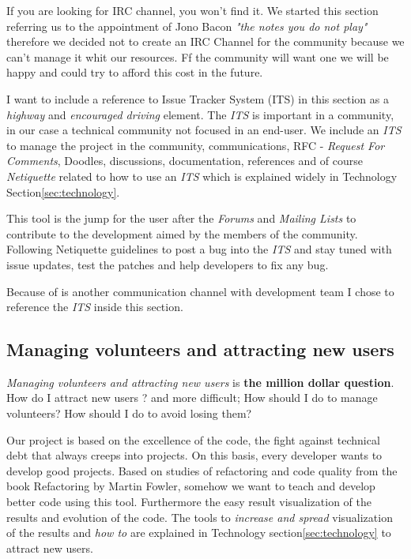 \documentclass[11pt]{scrartcl}
\begin{document}
\par If you are looking for IRC channel, you won't find it. We started this section referring us to the appointment of Jono Bacon \emph{"the notes you do not play"} therefore we decided not to create an IRC Channel for the community because we can't manage it whit our resources. Ff the community will want one we will be happy and could try to afford this cost in the future.

\par I want to include a reference to Issue Tracker System (ITS) in this section as a \emph{highway} and \emph{encouraged driving} element. The \emph{ITS} is important in a community, in our case a technical community not focused in an end-user. We include an \emph{ITS} to manage the project in the community, communications, RFC - \emph{Request For Comments}, Doodles, discussions, documentation, references and of course \emph{Netiquette} related to how to use an \emph{ITS} which is explained widely in Technology Section\ref{sec:technology}.

\par This tool is the jump for the user after the \emph{Forums} and \emph{Mailing Lists} to contribute to the development aimed by the members of the community. Following Netiquette guidelines to post a bug into the \emph{ITS} and stay tuned with issue updates, test the patches and help developers to fix any bug.

\par Because of is another communication channel with development team I chose to reference the \emph{ITS} inside this section.


\subsection{Managing volunteers and attracting new users}
\label{sub:volunteers-users}

\par \emph{Managing volunteers and attracting new users} is \textbf{the million dollar question}. How do I attract new users ? and more difficult; How should I do to manage volunteers? How should I do to avoid losing them?

\par Our project is based on the excellence of the code, the fight against technical debt that always creeps into projects. On this basis, every developer wants to develop good projects. Based on studies of refactoring and code quality from the book Refactoring by Martin Fowler\cite{refactoring}, somehow we want to teach and develop better code using this tool. Furthermore the easy result visualization of the results and evolution of the code. The tools to \emph{increase and spread} visualization of the results and \emph{how to} are explained in Technology section\ref{sec:technology} to attract new users.
\end{document}
